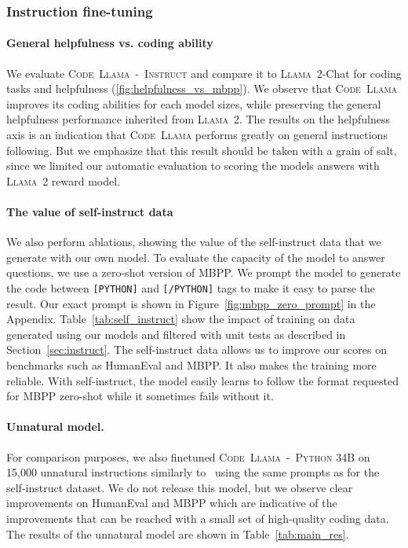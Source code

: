 \subsubsection{Instruction fine-tuning}\label{sec:inst_results}
\paragraph{General helpfulness vs. coding ability}

We evaluate \textsc{Code~Llama~-~Instruct} and compare it to \textsc{Llama~2}-Chat for coding tasks and helpfulness (\ref{fig:helpfulness_vs_mbpp}). 
We observe that \textsc{Code~Llama} improves its coding abilities for each model sizes, while preserving the general helpfulness performance inherited from \textsc{Llama~2}. 
The results on the helpfulness axis is an indication that \textsc{Code~Llama} performs greatly on general instructions following. But we emphasize that this result should be taken with a grain of salt, since we limited our automatic evaluation to scoring the models answers with \textsc{Llama~2} reward model.

\paragraph{The value of self-instruct data}

We also perform ablations, showing the value of the self-instruct data that we generate with our own model. To evaluate the capacity of the model to answer questions, we use a zero-shot version of MBPP. We prompt the model to generate the code between \texttt{[PYTHON]} and \texttt{[/PYTHON]} tags to make it easy to parse the result. Our exact prompt is shown in Figure~\ref{fig:mbpp_zero_prompt} in the Appendix.
Table~\ref{tab:self_instruct} show the impact of training on data generated using our models and filtered with unit tests as described in Section~\ref{sec:instruct}. The self-instruct data allows us to improve our scores on benchmarks such as HumanEval and MBPP. It also makes the training more reliable. With self-instruct, the model easily learns to follow the format requested for MBPP zero-shot while it sometimes fails without it.

\paragraph{Unnatural model.} For comparison purposes, we also finetuned \textsc{Code~Llama~-~Python} 34B on 15,000 unnatural instructions similarly to~\citet{honovich2022unnatural} using the same prompts as for the self-instruct dataset. We do not release this model, but we observe clear improvements on HumanEval and MBPP which are indicative of the improvements that can be reached with a small set of high-quality coding data. The results of the unnatural model are shown in Table~\ref{tab:main_res}. 

